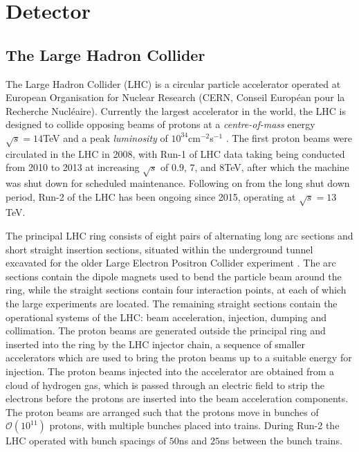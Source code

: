 \chapter{Detector}\label{c:Det}

\section{The Large Hadron Collider}

	The Large Hadron Collider (LHC) is a circular particle accelerator operated at European Organisation for Nuclear Research (CERN, Conseil Europ\'{e}an pour la Recherche Nucl\'{e}aire). Currently the largest accelerator in the world, the LHC is designed to collide opposing beams of protons at a \textit{centre-of-mass} energy $\sqrt{s}=14$TeV and a peak \textit{luminosity} of $10^{34}$cm$^{-2}$s$^{-1}$ \cite{lhc}. The first proton beams were circulated in the LHC in 2008, with Run-1 of LHC data taking being conducted from 2010 to 2013 at increasing $\sqrt{s}$ of $0.9$, $7$, and $8$TeV, after which the machine was shut down for scheduled maintenance. Following on from the long shut down period, Run-2 of the LHC has been ongoing since 2015, operating at $\sqrt{s}=13$TeV.

	The principal LHC ring consists of eight pairs of alternating long arc sections and short straight insertion sections, situated within the underground tunnel excavated for the older Large Electron Positron Collider experiment \cite{lep1, lep2}. The arc sections contain the dipole magnets used to bend the particle beam around the ring, while the straight sections contain four interaction points, at each of which the large experiments are located. The remaining straight sections contain the operational systems of the LHC: beam acceleration, injection,  dumping and collimation. The proton beams are generated outside the principal ring and inserted into the ring by the LHC injector chain, a sequence of smaller accelerators which are used to bring the proton beams up to a suitable energy for injection. The proton beams injected into the accelerator are obtained from a cloud of hydrogen gas, which is passed through an electric field to strip the electrons before the protons are inserted into the beam acceleration components. The proton beams are arranged such that the protons move in bunches of $\mathcal{O}(10^{11})$ protons, with multiple bunches placed into trains. During Run-2 the LHC operated with bunch spacings of $50$ns and $25$ns between the bunch trains.

